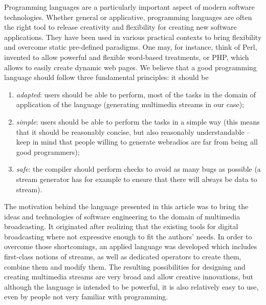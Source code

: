 \documentclass{llncs}
\begin{document}
Programming languages are a particularly important aspect of modern software
technologies.  Whether general or applicative, programming languages are often
the right tool to release creativity and flexibility for creating new software
applications.  They have been used in various practical contexts to bring
flexibility and overcome static pre-defined paradigms. One may, for instance,
think of Perl, invented to allow powerful and flexible word-based treatments, or
PHP, which allows to easily create dynamic web pages. We believe that a good
programming language should follow three fundamental principles: it should be
\begin{enumerate}
\item \emph{adapted}: users should be able to perform, most of the tasks in the
  domain of application of the language (generating multimedia streams in our
  case);
\item \emph{simple}: users should be able to perform the tasks in a simple way
  (this means that it should be reasonably concise, but also reasonably
  understandable -- keep in mind that people willing to generate webradios are
  far from being all good programmers);
\item \emph{safe}: the compiler should perform checks to avoid as many bugs as
  possible (a stream generator has for example to ensure that there will always
  be data to stream).
\end{enumerate}

The motivation behind the language presented in this article was to bring the
ideas and technologies of software engineering to the domain of multimedia
broadcasting. It originated after realizing that the existing tools for digital
broadcasting where not expressive enough to fit the authors' needs. In order to
overcome those shortcomings, an applied language was developed which
includes first-class notions of streams, as well as dedicated operators to
create them, combine them and modify them. The resulting possibilities for
designing and creating multimedia streams are very broad and allow creative
innovations, but although the language is intended to be powerful, it is also
relatively easy to use, even by people not very familiar with programming.

\end{document}
